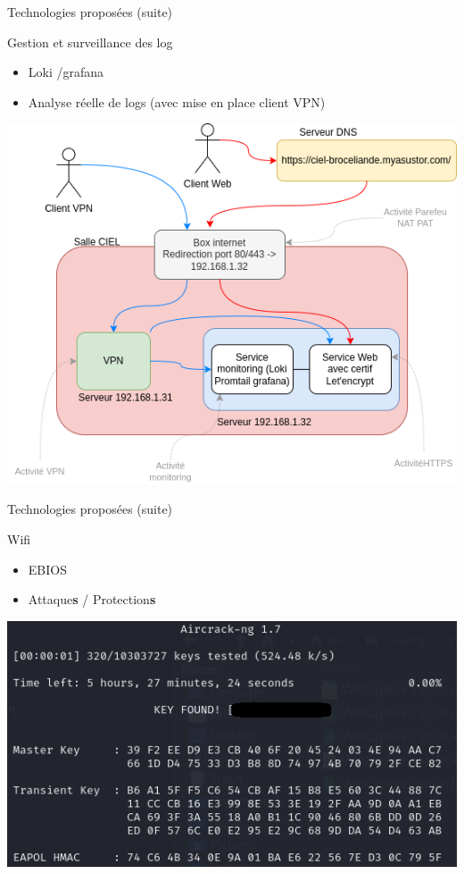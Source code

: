 \documentclass[12pt, handout]{beamer}
\begin{document}
\begin{frame}{Technologies proposées (suite)}

\begin{block}{Gestion et surveillance des log}
\begin{itemize}
\item Loki /grafana
\item Analyse réelle de logs (avec mise en place client VPN)
\end{itemize}
\end{block}

\begin{center}
\includegraphics[scale=0.3]{./ressource/topoReseau.drawio.png}
\end{center}
\end{frame}


\begin{frame}{Technologies proposées (suite)}
\begin{block}{Wifi}
\begin{itemize}
\item EBIOS
\item Attaque\textbf{s} / Protection\textbf{s}
\end{itemize}
\end{block}

\begin{center}
\includegraphics[scale=0.4]{./ressource/clefTrouvee.png}
\end{center}
\end{frame}
\end{document}
